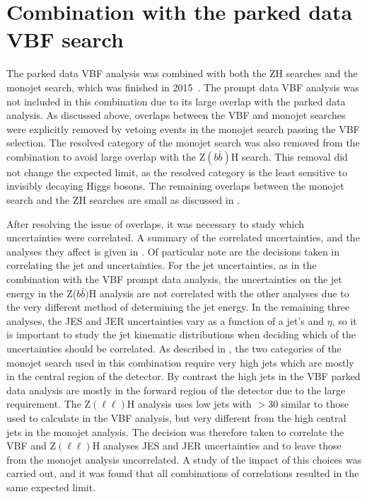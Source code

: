 \section{Combination with the parked data VBF search}
\label{sec:combparked}
The parked data \ac{VBF} analysis was combined with both the ZH searches and the monojet search, which was finished in 2015~\cite{CMS-PAS-HIG-15-012}. The prompt data \ac{VBF} analysis was not included in this combination due to its large overlap with the parked data analysis. As discussed above, overlaps between the \ac{VBF} and monojet searches were explicitly removed by vetoing events in the monojet search passing the \ac{VBF} selection. The resolved category of the monojet search was also removed from the combination to avoid large overlap with the Z$(b\bar{b})$H search. This removal did not change the expected limit, as the resolved category is the least sensitive to invisibly decaying Higgs bosons. The remaining overlaps between the monojet search and the ZH searches are small as discussed in .

After resolving the issue of overlaps, it was necessary to study which uncertainties were correlated. A summary of the correlated uncertainties, and the analyses they affect is given in . Of particular note are the decisions taken in correlating the jet and \MET uncertainties. For the jet uncertainties, as in the combination with the \ac{VBF} prompt data analysis, the uncertainties on the jet energy in the Z($b\bar{b})$H analysis are not correlated with the other analyses due to the very different method of determining the jet energy. In the remaining three analyses, the \ac{JES} and \ac{JER} uncertainties vary as a function of a jet's \pt and $\eta$, so it is important to study the jet kinematic distributions when deciding which of the uncertainties should be correlated. As described in , the two categories of the monojet search used in this combination require very high \pt jets which are mostly in the central region of the detector. By contrast the high \pt jets in the \ac{VBF} parked data analysis are mostly in the forward region of the detector due to the large \detajj requirement. The Z$(\ell\ell)$H analysis uses low \pt jets with \pt$>30$ \GeV similar to those used to calculate \jetmetdphi in the \ac{VBF} analysis, but very different from the high \pt central jets in the monojet analysis. The decision was therefore taken to correlate the \ac{VBF} and Z$(\ell\ell)$H analyses \ac{JES} and \ac{JER} uncertainties and to leave those from the monojet analysis uncorrelated. A study of the impact of this choices was carried out, and it was found that all combinations of correlations resulted in the same expected limit.

